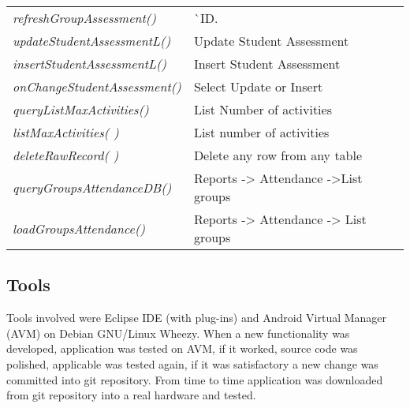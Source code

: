\begin{bclogo}[couleur=blue!30,arrondi=0.1, logo=\bcpanchant, barre=zigzag,  ombre=true ]
\begin{tabular}{lll}
\emph { refreshGroupAssessment()}       & { ^^ ID.} \\
\emph { updateStudentAssessmentL() }    & {  Update Student Assessment} \\
\emph { insertStudentAssessmentL() }    &{ Insert Student Assessment   }\\
\emph { onChangeStudentAssessment() }   & { Select Update or Insert  } \\
\emph { queryListMaxActivities() }      &{ List Number of activities } \\
\emph { listMaxActivities( ) }          &{ List number of activities } \\
\emph { deleteRawRecord( ) }            & { Delete any row from any table } \\
\emph { queryGroupsAttendanceDB() }     & Reports -> Attendance ->List  groups \\
\emph { loadGroupsAttendance()}         &{ Reports -> Attendance -> List  groups  } \\


\end{tabular}

\end{bclogo}  


  
		\subsection{Tools}
	
	Tools involved were Eclipse IDE (with plug-ins) and Android Virtual Manager (AVM) on Debian GNU/Linux Wheezy. When a new functionality was developed, application was tested on AVM,  if it worked, source code was polished, applicable was tested again, if it was satisfactory a new change was committed into git repository. From time to time application was downloaded from git repository into a real hardware and tested. 
	
